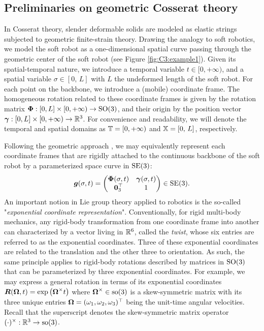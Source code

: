 \subsection{Preliminaries on geometric Cosserat theory}
In Cosserat theory, slender deformable solids are modeled as elastic strings subjected to geometric finite-strain theory. Drawing the analogy to soft robotics, we model the soft robot as a one-dimensional spatial curve passing through the geometric center of the soft robot (see Figure \ref{fig:C3:example1}). Given its spatial-temporal nature, we introduce a temporal variable $t \in [0,+\infty)$, and a spatial variable $\sigma \in [0,\,L]$ with $L$ the undeformed length of the soft robot. For each point on the backbone, we introduce a (mobile) coordinate frame. The homogeneous rotation related to these coordinate frames is given by the rotation matrix $\boldsymbol{\Phi}: [0,L] \times [0,+\infty) \to  \textup{\textrm{SO}}(3)$, and their origin by the position vector $\boldsymbol{\gamma}: [0,L] \times [0,+\infty) \to \mathbb{R}^3$. For convenience and readability, we will denote the temporal and spatial domains as $\mathbb{T} = [0,+\infty)$ and $\mathbb{X} = [0,\,L]$, respectively.

Following the geometric approach \cite{Simo1986,Boyer2010,Boyer2021,Renda2018,Renda2020}, we may equivalently represent each coordinate frames that are rigidly attached to the continuous backbone of the soft robot by a parameterized space curve in $\textup{\textrm{SE}}(3)$:
%
\begin{equation}
\boldsymbol{g}(\sigma,t) = \begin{pmatrix} \boldsymbol{\Phi}(\sigma,t) & \boldsymbol{\gamma}(\sigma,t) \\ \boldsymbol{0}_3^\top & 1 \end{pmatrix} \in \textup{\textrm{SE}}(3).
\label{eq:C3:backbone}
\end{equation}
%
An important notion in Lie group theory applied to robotics is the so-called "\textit{exponential coordinate representation}". Conventionally, for rigid multi-body mechanics, any rigid-body transformation from one coordinate frame into another can characterized by a vector living in $\mathbb{R}^6$, called the \textit{twist}, whose six entries are referred to as the exponential coordinates. Three of these exponential coordinates are related to the translation and the other three to orientation. As such, the same principle applies to rigid-body rotations described by matrices in $\textup{\textrm{SO}}(3)$ that can be parameterized by three exponential coordinates. For example, we may express a general rotation in terms of its exponential coordinates ${\boldsymbol{R}}(\boldsymbol{\Omega},t) = \exp\left( {\boldsymbol{\Omega}}^\times t \right)$ where $\boldsymbol{\Omega}^\times \in \textup{\textrm{so}}(3)$ is a skew-symmetric matrix with its three unique entries $\boldsymbol{\Omega} = (\omega_1,\omega_2,\omega_3)^\top$ being the unit-time angular velocities. Recall that the superscript denotes the skew-symmetric matrix operator $(\cdot)^\times:\mathbb{R}^3 \to \textup{\textrm{so}}(3)$. %

